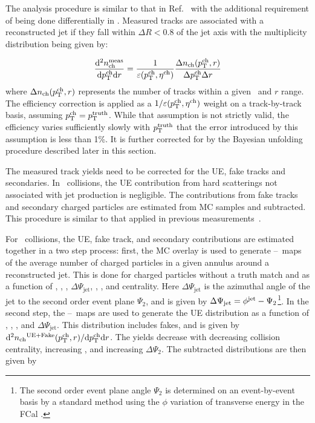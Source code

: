 
The analysis procedure is similar to that in Ref.~\cite{Aaboud:2018hpb} with the additional requirement of being done differentially in \rvar. Measured tracks are associated with a reconstructed jet if they fall within $\Delta R < 0.8$ of the jet axis with the multiplicity distribution being given by:

\begin{align*}
\dfrac{\mathrm{d}^{2} \mbox{$n_{\mathrm{ch}}^{\mathrm{meas}}$} }{ \mathrm{d} \mbox{$p_{\mathrm{T}}^{\mathrm{ch}}$} \mathrm{d} r} = \frac{1}{\varepsilon(\mbox{$p_{\mathrm{T}}^{\mathrm{ch}}$},\mbox{$\eta^{\mathrm{ch}}$})} \frac{\Delta \mbox{$n_{\mathrm{ch}}$}( \mbox{$p_{\mathrm{T}}^{\mathrm{ch}}$}, r)}{ \Delta\mbox{$p_{\mathrm{T}}^{\mathrm{ch}}$} \Delta r}
\end{align*}
where $\Delta \mbox{$n_{\mathrm{ch}}$} (\mbox{$p_{\mathrm{T}}^{\mathrm{ch}}$}, r)$ represents the number of tracks within a given \pttrk\ and $r$ range. The efficiency correction is applied as a $1/\varepsilon(\mbox{$p_{\mathrm{T}}^{\mathrm{ch}}$},\mbox{$\eta^{\mathrm{ch}}$})$ weight on a track-by-track basis, assuming $\mbox{$p_{\mathrm{T}}^{\mathrm{ch}}$} = \mbox{$p_{\mathrm{T}}^{\mathrm{truth}}$}$. While that assumption is not strictly valid, the efficiency varies sufficiently slowly with $\mbox{$p_{\mathrm{T}}^{\mathrm{truth}}$}$ that the error
introduced by this assumption is less than 1\%. It is further corrected for by the Bayesian unfolding procedure described later in this section.

The measured track yields need to be corrected for the UE, fake tracks and secondaries. In \pp\ collisions, the UE contribution from hard scatterings not associated with jet production is negligible. The contributions from fake tracks and secondary charged particles are estimated from MC samples and subtracted. This procedure is similar to that applied in previous measurements~\cite{Aaboud:2017tke,Aaboud:2018hpb}.


For \pbpb\ collisions, the UE, fake track, and secondary contributions are estimated together in a two step process: 
first, the MC overlay is used to generate \etajet--\phijet\ maps of the average number of charged particles in a given
 annulus around a reconstructed jet. This is done for charged particles without a truth match and as a function of
  \ptjet, \etajet, \phijet,  $\Delta\Psi_{\mathrm{jet}}$, \rvar, \pttrk, and centrality. Here $\Delta\Psi_{\mathrm{jet}}$ is
   the azimuthal angle of the jet to the second order event plane $\Psi_2$, and is given by $ \Delta\Psi_{\mathrm{jet}} 
   = \mbox{$\phi^{\mathrm{jet}}$} - \Psi_2$\footnote{The second order event plane angle $\Psi_2$ is determined on an event-by-event basis by a standard method using the $\phi$ variation of transverse energy in the FCal \cite{ATLAS:2012at}.}. In the second step, the \etajet--\phijet\ maps are used to generate the 
   UE distribution as a function of \ptjet, \etajet, \phijet, and $\Delta\Psi_{\mathrm{jet}}$. This distribution includes
    fakes, and is given by \mbox{$\mathrm{d}^2 \mbox{$n_{\mathrm{ch}}$}^{\mathrm{UE+Fake}}(\mbox{$p_{\mathrm{T}}^{\mathrm{ch}}$}, r) / \mathrm{d} \mbox{$p_{\mathrm{T}}^{\mathrm{ch}}$} \mathrm{d} r$}. The yields decrease with
     decreasing collision centrality, increasing \pttrk, and increasing $\Delta\Psi_2$. The subtracted distributions are then given by 

